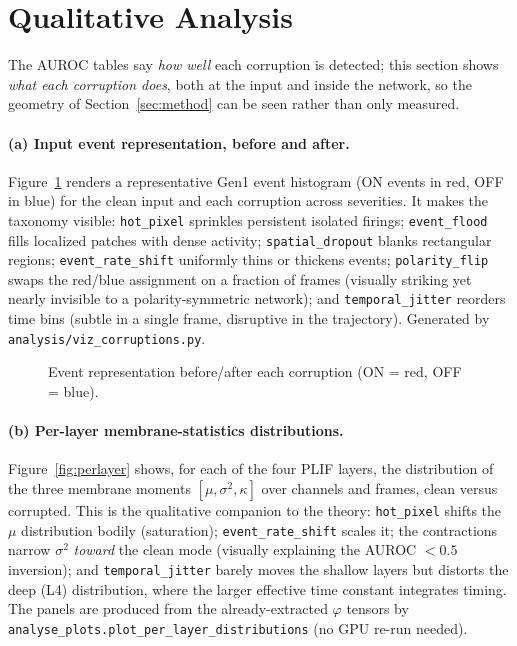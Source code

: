 \section{Qualitative Analysis}
\label{sec:qualitative}

The AUROC tables say \emph{how well} each corruption is detected; this section shows
\emph{what each corruption does}, both at the input and inside the network, so the geometry
of Section~\ref{sec:method} can be seen rather than only measured.

\paragraph{(a) Input event representation, before and after.}
Figure~\ref{fig:gallery} renders a representative Gen1 event histogram (ON events in red, OFF
in blue) for the clean input and each corruption across severities. It makes the taxonomy
visible: \texttt{hot\_pixel} sprinkles persistent isolated firings; \texttt{event\_flood}
fills localized patches with dense activity; \texttt{spatial\_dropout} blanks rectangular
regions; \texttt{event\_rate\_shift} uniformly thins or thickens events; \texttt{polarity\_flip}
swaps the red/blue assignment on a fraction of frames (visually striking yet nearly invisible
to a polarity-symmetric network); and \texttt{temporal\_jitter} reorders time bins (subtle in
a single frame, disruptive in the trajectory). Generated by
\texttt{analysis/viz\_corruptions.py}.

\begin{figure}[t]
  \centering
  \caption{Event representation before/after each corruption (ON = red, OFF = blue).}
  \label{fig:gallery}
\end{figure}

\paragraph{(b) Per-layer membrane-statistics distributions.}
Figure~\ref{fig:perlayer} shows, for each of the four PLIF layers, the distribution of the
three membrane moments $[\mu,\sigma^2,\kappa]$ over channels and frames, clean versus
corrupted. This is the qualitative companion to the theory: \texttt{hot\_pixel} shifts the
$\mu$ distribution bodily (saturation); \texttt{event\_rate\_shift} scales it; the
contractions narrow $\sigma^2$ \emph{toward} the clean mode (visually explaining the AUROC
$<0.5$ inversion); and \texttt{temporal\_jitter} barely moves the shallow layers but distorts
the deep (L4) distribution, where the larger effective time constant integrates timing. The
panels are produced from the already-extracted $\varphi$ tensors by
\texttt{analyse\_plots.plot\_per\_layer\_distributions} (no GPU re-run needed).

